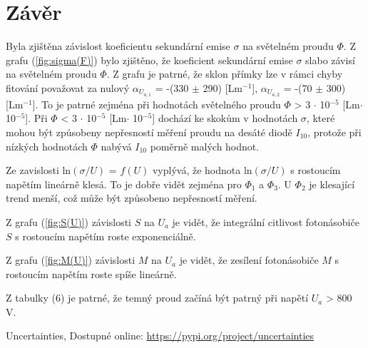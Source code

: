 \documentclass[a4paper,11pt]{article}
\begin{document}
        \section{Závěr} 
                Byla zjištěna závislost koeficientu sekundární emise $\sigma$ na světelném proudu $\Phi$. Z grafu (\ref{fig:sigma(F)}) bylo zjištěno, že koeficient sekundární emise $\sigma$ slabo závisí na světelném proudu $\Phi$. Z grafu je patrné, že sklon přímky lze v rámci chyby fitování považovat za nulový $\alpha_{U_{a,1}}$ = -(330 $\pm$ 290) [Lm$^{-1}$], $\alpha_{U_{a,2}}$ = -(70 $\pm$ 300) [Lm$^{-1}$]. To je patrné zejména při hodnotách světelného proudu $\Phi$ > 3 $\cdot$ 10$^{-5}$ [Lm$\cdot$ 10$^{-5}$]. Při $\Phi$ < 3 $\cdot$ 10$^{-5}$ [Lm$\cdot$ 10$^{-5}$] dochází ke skokům v hodnotách $\sigma$, které mohou být způsobeny nepřesností měření proudu na desáté diodě $I_{10}$, protože při nízkých hodnotách $\Phi$ nabývá $I_{10}$ poměrně malých hodnot. 

                \vspace{5pt}
                \par Ze zavislosti ln$(\sigma / U)$ = $f(U)$ vyplývá, že hodnota ln$(\sigma / U)$ s rostoucím napětím lineárně klesá. To je dobře vidět zejména pro $\Phi_1$ a $\Phi_3$. U $\Phi_2$ je klesající trend menší, což může být způsobeno nepřesností měření. 
                
                \vspace{5pt}
                \par Z grafu (\ref{fig:S(U)}) závislosti $S$ na $U_a$ je vidět, že integrální citlivost fotonásobiče $S$ s rostoucím napětím roste exponenciálně. 

                \vspace{5pt}
                \par Z grafu (\ref{fig:M(U)}) závislosti $M$ na $U_a$ je vidět, že zesílení fotonásobiče $M$ s rostoucím napětím roste spíše lineárně.

                \vspace{5pt}
                \par Z tabulky (6) je patrné, že temný proud začíná být patrný při napětí $U_a$ > 800 V.

                \renewcommand{\refname}{Odkazy}
                \begin{thebibliography}{9}
                        Uncertainties, Dostupné online: \url{https://pypi.org/project/uncertainties}
                \end{thebibliography} 
\end{document}
